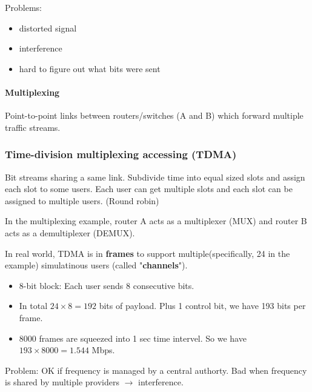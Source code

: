 \documentclass{../../ainote}
\begin{document}
Problems:
\begin{itemize}
    \item distorted signal
    \item interference
    \item hard to figure out what bits were sent
\end{itemize}

\paragraph{Multiplexing}\mbox\\
Point-to-point links between routers/switches (A and B) which forward multiple traffic streams.  

\subsubsection{Time-division multiplexing accessing (TDMA)}
Bit streams sharing a same link. Subdivide time into equal sized slots and assign each slot to some users.
Each user can get multiple slots and each slot can be assigned to multiple users. (Round robin)

In the multiplexing example, router A acts as a multiplexer (MUX) and router B acts as a demultiplexer (DEMUX).

In real world, TDMA is in \textbf{frames} to support multiple(specifically, 24 in the example) simulatinous users (called "\textbf{channels}").
\begin{itemize}[leftmargin=*]
    \item 8-bit block: Each user sends 8 consecutive bits.
    \item In total $24\times 8=192$ bits of payload. Plus 1 control bit, we have 193 bits per frame.
    \item 8000 frames are squeezed into 1 sec time intervel. So we have $193\times 8000=1.544$ Mbps.
\end{itemize}

\begin{note}
    Problem: OK if frequency is managed by a central authorty. Bad when frequency is shared by multiple providers $\rightarrow$ interference.
\end{note}
\end{document}
